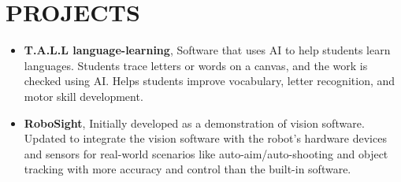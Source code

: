 \documentclass[letterpaper,11pt]{article}
\newcommand{\resumeItem}[1]{
  \item\small{
    {#1 \vspace{-1pt}}
  }
}
\newcommand{\resumeItemListStart}{\begin{itemize}[leftmargin=0.1in]}
\newcommand{\resumeItemListEnd}{\end{itemize}\vspace{-5pt}}
\begin{document}
\vspace{-12pt}


\section{\color{airforceblue}PROJECTS}    
    \resumeItemListStart
        \vspace{0.5pt}

        \resumeItem{\normalsize{\textbf{T.A.L.L language-learning}, Software that uses AI to help students learn languages. Students trace letters or words on a canvas, and the work is checked using AI.
        Helps students improve vocabulary,  letter recognition, and motor skill development.}}
        \vspace{-5pt}

        \resumeItem{\normalsize{\textbf{RoboSight}, Initially developed as a demonstration of vision software. Updated to integrate the vision software with the robot’s hardware devices and sensors for real-world scenarios like auto-aim/auto-shooting and object tracking with more accuracy and control than the built-in software.}}  
        \vspace{-5pt}


        
    \resumeItemListEnd  
   
 \vspace{-12pt}
\end{document}
